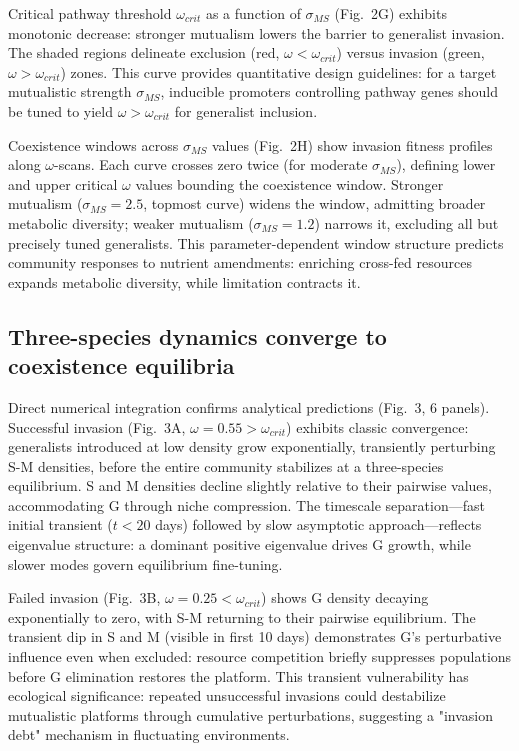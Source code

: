 \documentclass[9pt,twocolumn,twoside]{pnas-new}
\begin{document}
Critical pathway threshold $\omega_{crit}$ as a function of $\sigma_{MS}$ (Fig.~2G) exhibits monotonic decrease: stronger mutualism lowers the barrier to generalist invasion. The shaded regions delineate exclusion (red, $\omega < \omega_{crit}$) versus invasion (green, $\omega > \omega_{crit}$) zones. This curve provides quantitative design guidelines: for a target mutualistic strength $\sigma_{MS}$, inducible promoters controlling pathway genes should be tuned to yield $\omega > \omega_{crit}$ for generalist inclusion.

Coexistence windows across $\sigma_{MS}$ values (Fig.~2H) show invasion fitness profiles along $\omega$-scans. Each curve crosses zero twice (for moderate $\sigma_{MS}$), defining lower and upper critical $\omega$ values bounding the coexistence window. Stronger mutualism ($\sigma_{MS} = 2.5$, topmost curve) widens the window, admitting broader metabolic diversity; weaker mutualism ($ \sigma_{MS} = 1.2$) narrows it, excluding all but precisely tuned generalists. This parameter-dependent window structure predicts community responses to nutrient amendments: enriching cross-fed resources expands metabolic diversity, while limitation contracts it.

\subsection*{Three-species dynamics converge to coexistence equilibria}

Direct numerical integration confirms analytical predictions (Fig.~3, 6 panels). Successful invasion (Fig.~3A, $\omega = 0.55 > \omega_{crit}$) exhibits classic convergence: generalists introduced at low density grow exponentially, transiently perturbing S-M densities, before the entire community stabilizes at a three-species equilibrium. S and M densities decline slightly relative to their pairwise values, accommodating G through niche compression. The timescale separation—fast initial transient ($t < 20$ days) followed by slow asymptotic approach—reflects eigenvalue structure: a dominant positive eigenvalue drives G growth, while slower modes govern equilibrium fine-tuning.

Failed invasion (Fig.~3B, $\omega = 0.25 < \omega_{crit}$) shows G density decaying exponentially to zero, with S-M returning to their pairwise equilibrium. The transient dip in S and M (visible in first 10 days) demonstrates G's perturbative influence even when excluded: resource competition briefly suppresses populations before G elimination restores the platform. This transient vulnerability has ecological significance: repeated unsuccessful invasions could destabilize mutualistic platforms through cumulative perturbations, suggesting a "invasion debt" mechanism in fluctuating environments.
\end{document}
